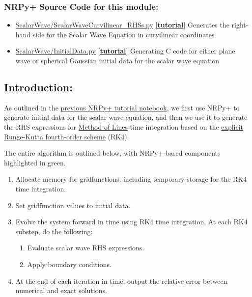 \documentclass[landscape,letterpaper,10pt,english]{article}
\providecommand{\tightlist}{%
      \setlength{\itemsep}{0pt}\setlength{\parskip}{0pt}}
\begin{document}
\hypertarget{nrpy-source-code-for-this-module}{%
\subsubsection{NRPy+ Source Code for this
module:}\label{nrpy-source-code-for-this-module}}

\begin{itemize}
\tightlist
\item
  \href{../edit/ScalarWave/ScalarWaveCurvilinear_RHSs.py}{ScalarWave/ScalarWaveCurvilinear\_RHSs.py}
  \href{Tutorial-ScalarWaveCurvilinear.ipynb}{{[}\textbf{tutorial}{]}}
  Generates the right-hand side for the Scalar Wave Equation in
  curvilinear coordinates
\item
  \href{../edit/ScalarWave/InitialData.py}{ScalarWave/InitialData.py}
  \href{Tutorial-ScalarWave.ipynb}{{[}\textbf{tutorial}{]}} Generating C
  code for either plane wave or spherical Gaussian initial data for the
  scalar wave equation
\end{itemize}

\hypertarget{introduction}{%
\subsection{Introduction:}\label{introduction}}

As outlined in the \href{Tutorial-ScalarWaveCurvilinear.ipynb}{previous
NRPy+ tutorial notebook}, we first use NRPy+ to generate initial data
for the scalar wave equation, and then we use it to generate the RHS
expressions for
\href{https://reference.wolfram.com/language/tutorial/NDSolveMethodOfLines.html}{Method
of Lines} time integration based on the
\href{https://en.wikipedia.org/wiki/Runge\%E2\%80\%93Kutta_methods}{explicit
Runge-Kutta fourth-order scheme} (RK4).

The entire algorithm is outlined below, with NRPy+-based components
highlighted in green.

\begin{enumerate}
\def\labelenumi{\arabic{enumi}.}
\tightlist
\item
  Allocate memory for gridfunctions, including temporary storage for the
  RK4 time integration.
\item
  Set gridfunction values to initial data.
\item
  Evolve the system forward in time using RK4 time integration. At each
  RK4 substep, do the following:

  \begin{enumerate}
  \def\labelenumii{\arabic{enumii}.}
  \tightlist
  \item
    Evaluate scalar wave RHS expressions.
  \item
    Apply boundary conditions.
  \end{enumerate}
\item
  At the end of each iteration in time, output the relative error
  between numerical and exact solutions.
\end{enumerate}
\end{document}
